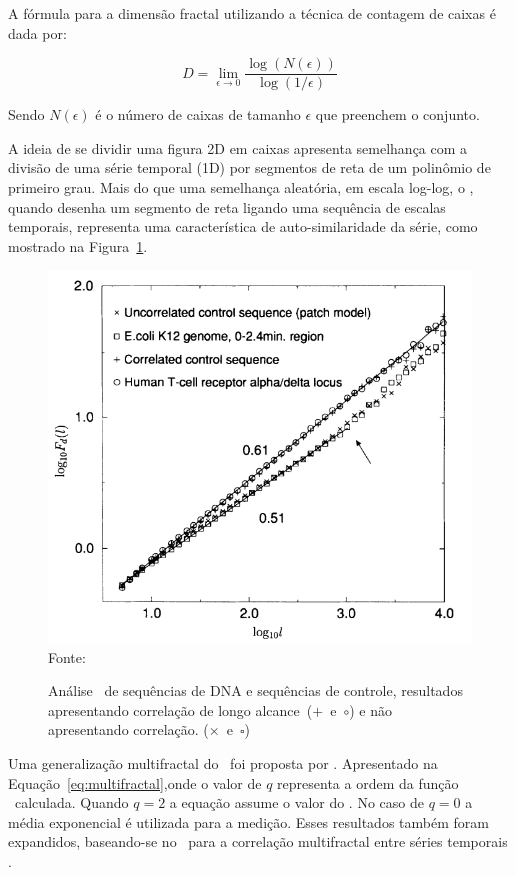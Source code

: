 A fórmula para a dimensão fractal utilizando a técnica de contagem de caixas é dada por:

\begin{equation}\label{eq:Hausdorff}
  D = \lim_{\epsilon \to 0} \frac{\log(N(\epsilon))}{\log(1/\epsilon)}
\end{equation}


Sendo $N(\epsilon)$ é o número de caixas de tamanho $\epsilon$ que preenchem o conjunto.


A ideia de se dividir uma figura 2D em caixas apresenta semelhança com a divisão de uma série temporal (1D) por segmentos de reta de um polinômio de primeiro grau. Mais do que uma semelhança aleatória, em escala log-log, o \dfa, quando desenha um segmento de reta ligando uma sequência de escalas temporais, representa uma característica de auto-similaridade da série, como mostrado na Figura~\ref{fig:peng01}. \cite{}

\begin{figure}[!htb]
	\centering
	\caption{Análise \dfa~de sequências de DNA e sequências de controle, resultados apresentando correlação de longo alcance~($+$~e~$\circ$) e não apresentando correlação. ($\times$~e~$\square$) }
	\includegraphics[width=.8\textwidth]{../Figures/peng.png}
	\\{\footnotesize Fonte: \cite{Peng1994}}
	\label{fig:peng01}
\end{figure}

Uma generalização multifractal do \dfa~foi proposta por . Apresentado na Equação~\ref{eq:multifractal},onde o valor de $q$ representa a ordem da função \dfa~calculada. Quando $q=2$ a equação assume o valor do \dfa. No caso de $q=0$ a média exponencial é utilizada para a medição. Esses resultados também foram expandidos, baseando-se no \dcca~para a correlação multifractal entre séries temporais \cite{zhouMultifractalDetrendedCrosscorrelation2008}.

